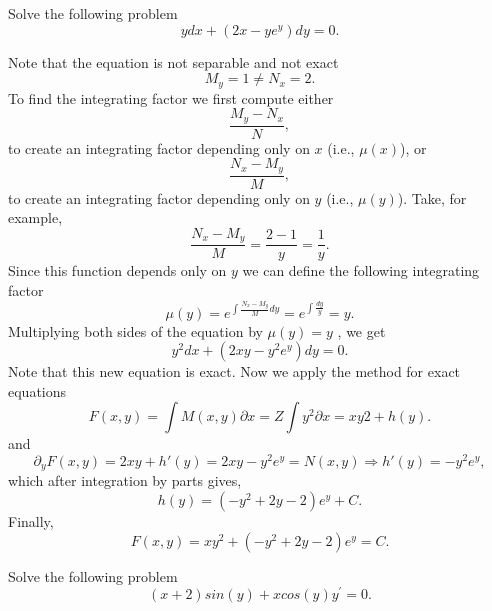 \documentclass[11pt]{article}
\begin{document}
\begin{problem}
Solve the following problem
\begin{equation*}
ydx + (2x - y e^{y}) dy = 0.
\end{equation*}
\end{problem}
\begin{solution}
Note that the equation is not separable and not exact
\[M _{y} = 1 \neq N_{ x} = 2 .\]
To find the integrating factor we first compute either
\[\frac {M_{ y} - N_{ x}} {N} ,\]
to create an integrating factor depending only on $x$ (i.e., $\mu( x )$), or
\[\frac{N_{ x} - M_{ y}}{ M} ,\]
to create an integrating factor depending only on $y$ (i.e., $\mu ( y )$).
Take, for example,
\[\frac{N_{ x} - M_{ y}}{ M} = \frac{2 - 1}{ y} = \frac{1}{y}.\]
Since this function depends only on $y$ we can define the following integrating factor 
\[\mu( y ) = e^{ \int \frac{N_{ x} - M_{ y}}{ M} dy }= e^{ \int \frac{ dy}{ y}} = y.\]
Multiplying both sides of the equation by $\mu ( y ) = y$ , we get
\[y^{ 2} dx + (2 xy - y^{ 2} e^{ y} ) dy = 0 .\]
Note that this new equation is exact.  Now we apply the method for exact equations
\[F ( x,y ) = \int M ( x,y ) \partial x = Z\int y^{ 2} \partial x = xy 2 + h ( y ) .\]
and
\[\partial_{ y} F ( x,y ) = 2 xy + h'( y ) = 2 xy - y^{ 2} e^{ y} = N ( x,y ) \Rightarrow h'( y ) = - y^{ 2} e^{ y} ,\]
which after integration by parts gives,
\[ h ( y ) = ( - y^{ 2} + 2 y - 2) e^{y} +C.\]
Finally,
\[\boxed{F ( x,y ) = xy^{ 2} + ( - y^{ 2} + 2 y - 2) e^{ y} = C }.\]
\end{solution}



\begin{problem}
Solve the following problem
\begin{equation*}
\left( x + 2 \right) sin(y) + x cos(y) y^{\prime} = 0.
\end{equation*}
\end{problem}
\end{document}
